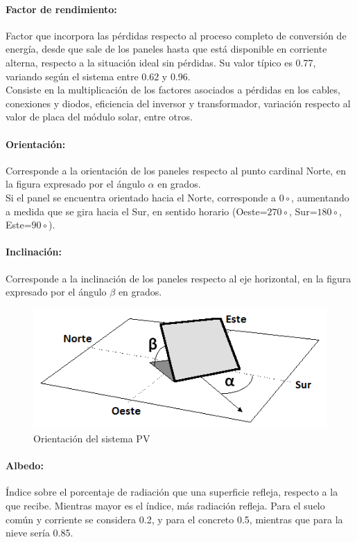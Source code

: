 \paragraph{Factor de rendimiento:} Factor que incorpora las pérdidas respecto al proceso completo de conversión de energía, desde que sale de los paneles hasta que está disponible en corriente alterna, respecto a la situación ideal sin pérdidas. Su valor típico es 0.77, variando según el sistema entre 0.62 y 0.96.\\
Consiste en la multiplicación de los factores asociados a pérdidas en los cables, conexiones y diodos, eficiencia del inversor y transformador, variación respecto al valor de placa del módulo solar, entre otros.

\paragraph{Orientación:} Corresponde a la orientación de los paneles respecto al punto cardinal Norte, en la figura expresado por el ángulo $\alpha$ en grados.\\Si el panel se encuentra orientado hacia el Norte, corresponde a $0\circ$, aumentando a medida que se gira hacia el Sur, en sentido horario (Oeste=$270\circ$, Sur=$180\circ$, Este=$90\circ$).

\paragraph{Inclinación:} Corresponde a la inclinación de los paneles respecto al eje horizontal, en la figura expresado por el ángulo $\beta$ en grados.

\begin{figure}[h]
        \centering
        \includegraphics[scale=0.5]{./images/planoPanelSolar}
        \caption{Orientación del sistema PV}
        \label{orientacionSistemaPV}
\end{figure}

\paragraph{Albedo:} Índice sobre el porcentaje de radiación que una superficie refleja, respecto a la que recibe. Mientras mayor es el índice, más radiación refleja. Para el suelo común y corriente se considera 0.2, y para el concreto 0.5, mientras que para la nieve sería 0.85.

